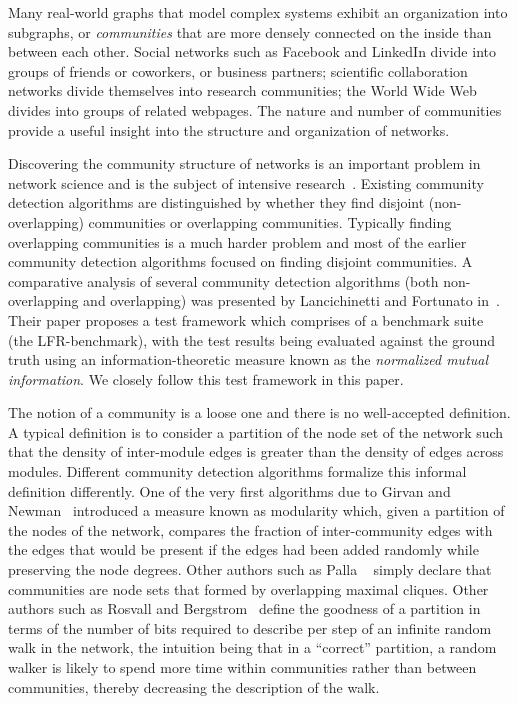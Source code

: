 Many real-world graphs that model complex systems exhibit an organization 
into subgraphs, or \textit{communities} that are more densely connected on the inside than between each other. 
Social networks such as Facebook and LinkedIn divide into groups of friends 
or coworkers, or business partners; scientific collaboration networks divide 
themselves into research communities; the World Wide Web divides into groups 
of related webpages. The nature and number of communities provide 
a useful insight into the structure and organization of networks. 

Discovering the community structure of networks is an 
important problem in network science and is the subject 
of intensive research~\cite{GN02, GN04, CNM04, RCC04, DM04, PDFV05, NL07, 
BGLL08, RB08, RN09}. Existing community detection algorithms are 
distinguished by whether they find disjoint (non-overlapping) 
communities or overlapping communities. Typically finding 
overlapping communities is a much harder problem and most of the 
earlier community detection algorithms focused on finding disjoint 
communities. A comparative analysis of several community detection algorithms 
(both non-overlapping and overlapping) was presented by Lancichinetti and Fortunato 
in~\cite{LF09}. Their paper proposes a test framework which comprises of a 
benchmark suite (the LFR-benchmark), with the test results being evaluated against 
the ground truth using an information-theoretic measure known as the \emph{normalized 
mutual information}. We closely follow this test framework in this paper. 


The notion of a community is a loose one and there is no well-accepted definition.
A typical definition is to consider a partition of the node set of the network 
such that the density of inter-module edges is greater than the density of edges 
across modules. Different community detection algorithms formalize this informal 
definition differently. One of the very first algorithms due to 
Girvan and Newman~\cite{GN02} introduced a measure known as modularity 
which, given a partition of the nodes of the network, compares the fraction of 
inter-community edges with the edges that would be present if the edges had been 
added randomly while preserving the node degrees. Other authors such as Palla 
\etal~\cite{PDFV05} simply declare that communities are node sets that formed 
by overlapping maximal cliques. Other authors such as Rosvall and Bergstrom~\cite{RB08} 
define the goodness of a partition in terms of the number of bits required to 
describe per step of an infinite random walk in the network, the intuition being 
that in a ``correct'' partition, a random walker is likely to spend more time 
within communities rather than between communities, thereby decreasing the 
description of the walk.  


